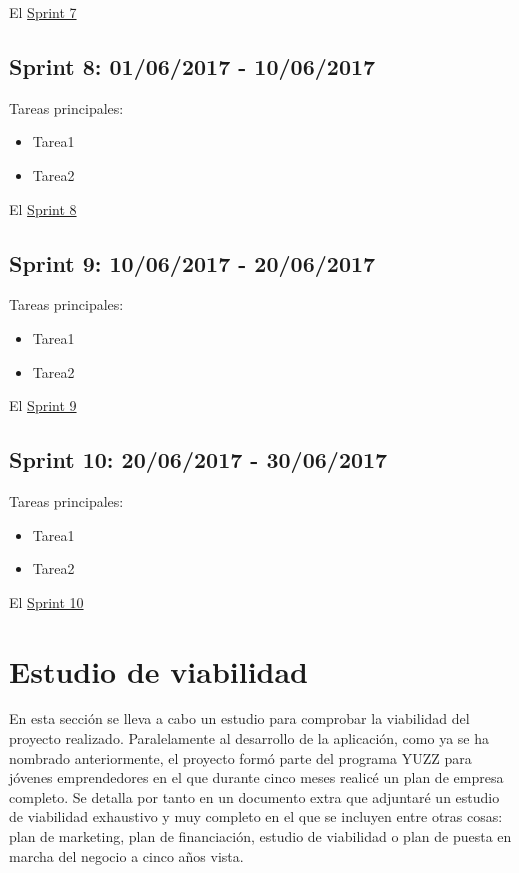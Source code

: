 
El \underline{Sprint 7} 

\subsection{Sprint 8: 01/06/2017 - 10/06/2017}\label{sprint8}

Tareas principales:

\begin{itemize}
	\item Tarea1
	\item Tarea2
\end{itemize}


El \underline{Sprint 8} 

\subsection{Sprint 9: 10/06/2017 - 20/06/2017}\label{sprint9}

Tareas principales:

\begin{itemize}
	\item Tarea1
	\item Tarea2
\end{itemize}


El \underline{Sprint 9} 

\subsection{Sprint 10: 20/06/2017 - 30/06/2017}\label{sprint10}

Tareas principales:

\begin{itemize}
	\item Tarea1
	\item Tarea2
\end{itemize}


El \underline{Sprint 10} 


\section{Estudio de viabilidad}\label{estudio-viabilidad}
En esta sección se lleva a cabo un estudio para comprobar la viabilidad del proyecto realizado. Paralelamente al desarrollo de la aplicación, como ya se ha nombrado anteriormente, el proyecto formó parte del programa YUZZ para jóvenes emprendedores en el que durante cinco meses realicé un plan de empresa completo. Se detalla por tanto en un documento extra que adjuntaré un estudio de viabilidad exhaustivo  y muy completo en el que se incluyen entre otras cosas: plan de marketing, plan de financiación, estudio de viabilidad o plan de puesta en marcha del negocio a cinco años vista. 

